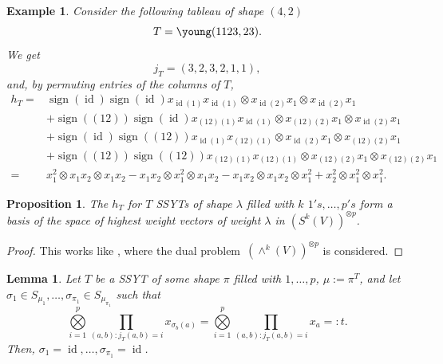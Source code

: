 \documentclass[a4paper]{amsart}
\newtheorem{proposition}{Proposition}
\newtheorem{example}{Example}
\newtheorem{lemma}{Lemma}
\DeclareMathOperator{\sign}{\mathrm{sign}}
\DeclareMathOperator{\id}{\mathrm{id}}
\begin{document}
\begin{example}
	Consider the following tableau of shape $(4,2)$
	\begin{displaymath}
		T=\young(1123,23).
	\end{displaymath}
	We get
	\begin{displaymath}
		j_T=(3,2,3,2,1,1),
	\end{displaymath}
	and, by \glqq permuting entries of the columns of $T$\grqq,
	\begin{align*}
		h_T=&
		\sign(\id)\sign(\id)x_{\id(1)}x_{\id(1)}\otimes x_{\id(2)}x_1\otimes x_{\id(2)}x_1\\
		&+\sign((12))\sign(\id)x_{(12)(1)}x_{\id(1)}\otimes x_{(12)(2)}x_1\otimes x_{\id(2)}x_1\\
		&+\sign(\id)\sign((12))x_{\id(1)}x_{(12)(1)}\otimes x_{\id(2)}x_1\otimes x_{(12)(2)}x_1\\
		&+\sign((12))\sign((12))x_{(12)(1)}x_{(12)(1)}\otimes x_{(12)(2)}x_1\otimes x_{(12)(2)}x_1\\
		=&x_1^2\otimes x_1x_2\otimes x_1x_2-
		x_1x_2\otimes x_1^2\otimes x_1x_2
		-x_1x_2\otimes x_1x_2\otimes x_1^2
		+x_2^2\otimes x_1^2\otimes x_1^2.
	\end{align*}
\end{example}
\begin{proposition}\label{connection:prop}
	The $h_T$ for $T$ SSYTs of shape $\lambda$ filled with $k$ $1's,\ldots, p's$ form a basis of the space of highest weight vectors of weight $\lambda$ in $(S^k(V))^{\otimes p}$.
\end{proposition}
\begin{proof}
	This works like \cite[Prop. 2.3]{MM14}, where the \glqq dual problem\grqq\  $(\wedge^k(V))^{\otimes p}$ is considered.
\end{proof}
\begin{lemma}\label{connection:lemma4}
	Let $T$ be a SSYT of some shape $\pi$ filled with $1,\ldots,p$, $\mu:=\pi^T$, and let $\sigma_1\in S_{\mu_1},\ldots,\sigma_{\pi_1}\in S_{\mu_{\pi_1}}$ such that
	\begin{displaymath}
		\bigotimes\limits_{i=1}^p\prod\limits_{(a,b):j_T(a,b)=i}x_{\sigma_b(a)}=
		\bigotimes\limits_{i=1}^p\prod\limits_{(a,b):j_T(a,b)=i}x_{a}=:t.
	\end{displaymath}
	Then, $\sigma_1=\id,\ldots,\sigma_{\pi_1}=\id$.
\end{lemma}
\end{document}
